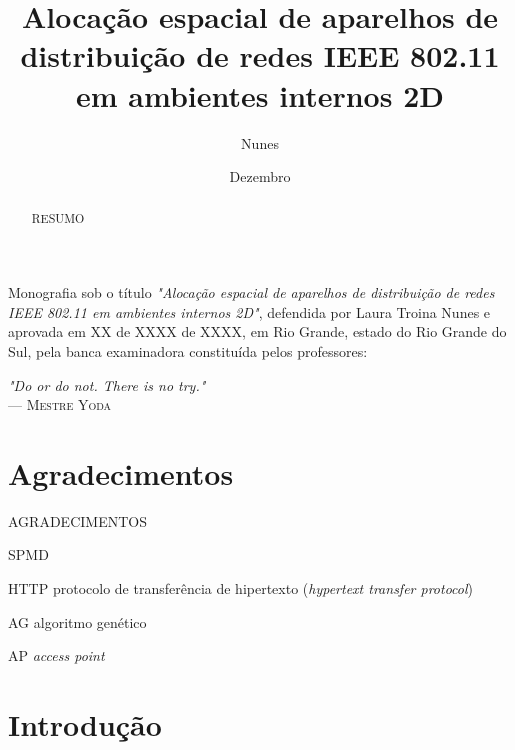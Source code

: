 \documentclass[tc,twoside]{iiufrgs}
\title{Alocação espacial de aparelhos de distribuição de redes IEEE 802.11 em ambientes internos 2D}
\author{Nunes}{Laura Troina}
\date{Dezembro}{2016}
\begin{document}
 

\maketitle 

\begin{folhadeaprovacao} 
	Monografia sob o título \textit{"Alocação espacial de aparelhos de distribuição de redes IEEE 802.11 em ambientes internos 2D"}, defendida por Laura Troina Nunes e aprovada em XX de XXXX de XXXX, em Rio Grande, estado do Rio Grande do Sul, pela banca examinadora constituída pelos professores: 
\end{folhadeaprovacao} 

\clearpage 

\begin{flushright} 
	\mbox{}\vfill 
	{\sffamily\itshape 
		"Do or do not. There is no try."\\} 
	--- \textsc{Mestre Yoda} 
\end{flushright} 

\chapter*{Agradecimentos} 

AGRADECIMENTOS

\tableofcontents 

\begin{listofabbrv}{SPMD} 
	\item[HTTP] protocolo de transferência de hipertexto (\textit{hypertext transfer protocol}) 
	\item[AG] algoritmo genético
	\item[AP] \textit{access point}
\end{listofabbrv} 

\listoffigures 

\listoftables 

\begin{abstract} 
RESUMO
\end{abstract} 

\chapter{Introdução} 
\end{document}
